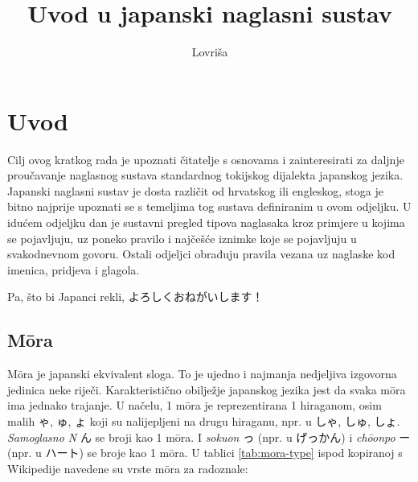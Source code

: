 \documentclass[12pt]{extarticle}
\title{Uvod u japanski naglasni sustav}
\author{Lovriša}
\begin{document}
	\onehalfspacing
	\maketitle
	\thispagestyle{empty}
	\tableofcontents
	\newpage
	
	
	\section{Uvod}
	Cilj ovog kratkog rada je upoznati čitatelje s osnovama i zainteresirati za daljnje proučavanje naglasnog sustava standardnog tokijskog dijalekta japanskog jezika.
	Japanski naglasni sustav je dosta različit od hrvatskog ili engleskog, stoga je bitno najprije upoznati se s temeljima tog sustava definiranim u ovom odjeljku.
	U idućem odjeljku dan je sustavni pregled tipova naglasaka kroz primjere u kojima se pojavljuju, uz poneko pravilo i najčešće iznimke koje se pojavljuju u svakodnevnom govoru.
	Ostali odjeljci obrađuju pravila vezana uz naglaske kod imenica, pridjeva i glagola.
	
	Pa, što bi Japanci rekli, よろしくおねがいします！
	
	\subsection{M\=ora}
	M\=ora je japanski ekvivalent sloga.
	To je ujedno i najmanja nedjeljiva izgovorna jedinica neke riječi.
	Karakteristično obilježje japanskog jezika jest da svaka m\=ora ima jednako trajanje.
	U načelu, 1 m\=ora je reprezentirana 1 hiraganom, osim malih ゃ, ゅ, ょ koji su nalijepljeni na drugu hiraganu, npr. u しゃ, しゅ, しょ.
	\textit{Samoglasno N} ん se broji kao 1 m\=ora.
	I \textit{sokuon} っ (npr. u げっかん) i \textit{ch\=oonpo} ー  (npr. u ハート) se broje kao 1 m\=ora.
	U tablici \ref{tab:mora-type} ispod kopiranoj s Wikipedije navedene su vrste m\=ora za radoznale:
	
\end{document}
